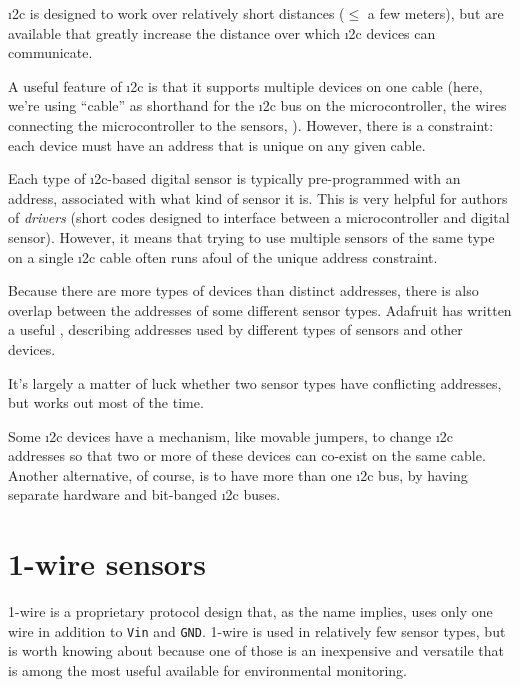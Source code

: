 \i2c is designed to work over relatively short distances ($\le$ a few meters), but  are available that greatly increase the distance over which \i2c devices can communicate.

A useful feature of \i2c is that it supports multiple devices on one cable (here, we're using ``cable'' as shorthand for the \i2c bus on the microcontroller, the wires connecting the microcontroller to the sensors, \etc).
However, there is a constraint: each device must have an address that is unique on any given cable.

Each type of \i2c-based digital sensor is typically pre-programmed with an address, associated with what kind of sensor it is.
This is very helpful for authors of \emph{drivers} (short codes designed to interface between a microcontroller and digital sensor).
However, it means that trying to use multiple sensors of the same type on a single \i2c cable often runs afoul of the unique address constraint.

Because there are more types of devices than distinct addresses, there is also overlap between the addresses of some different sensor types.
Adafruit has written a useful , describing addresses used by different types of sensors and other devices.


It's largely a matter of luck whether two sensor types have conflicting addresses, but works out most of the time.

Some \i2c devices have a mechanism, like movable jumpers, to change \i2c addresses so that two or more of these devices can co-exist on the same cable.  
Another alternative, of course, is to have more than one \i2c bus, \eg by having separate hardware and bit-banged \i2c buses.


\section{1-wire sensors}
1-wire is a proprietary protocol design that, as the name implies, uses only one wire in addition to \texttt{Vin} and \texttt{GND}. 
1-wire is used in relatively few sensor types, but is worth knowing about because one of those is an inexpensive and versatile  that is among the most useful available for environmental monitoring.

